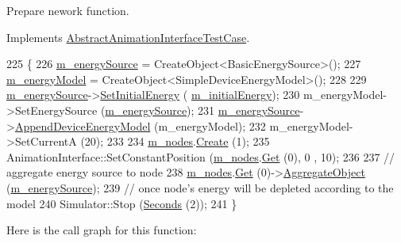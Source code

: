 Prepare nework function. 



Implements \hyperlink{classAbstractAnimationInterfaceTestCase_af9fb9b43d1f48224178f9e19692039a6}{Abstract\+Animation\+Interface\+Test\+Case}.


\begin{DoxyCode}
225 \{
226   \hyperlink{classAnimationRemainingEnergyTestCase_ab57a5fb126e09a5001d23ced08867778}{m\_energySource} = CreateObject<BasicEnergySource>();
227   \hyperlink{classAnimationRemainingEnergyTestCase_a992202ae075859acd996f44fd3396d68}{m\_energyModel} = CreateObject<SimpleDeviceEnergyModel>();
228 
229   \hyperlink{classAnimationRemainingEnergyTestCase_ab57a5fb126e09a5001d23ced08867778}{m\_energySource}->\hyperlink{classns3_1_1BasicEnergySource_ae554fd5c9a66409a364b1d58f20bb4cc}{SetInitialEnergy} (
      \hyperlink{classAnimationRemainingEnergyTestCase_a2e8b91bd1e920bea38977402cd602b3c}{m\_initialEnergy});
230   m\_energyModel->SetEnergySource (\hyperlink{classAnimationRemainingEnergyTestCase_ab57a5fb126e09a5001d23ced08867778}{m\_energySource});
231   \hyperlink{classAnimationRemainingEnergyTestCase_ab57a5fb126e09a5001d23ced08867778}{m\_energySource}->\hyperlink{classns3_1_1EnergySource_a075fe242ae7523cc071752ab1b6b7c02}{AppendDeviceEnergyModel} (m\_energyModel);
232   m\_energyModel->SetCurrentA (20);
233 
234   \hyperlink{classAbstractAnimationInterfaceTestCase_aa051bd1bbd7f335a863a168c27167b38}{m\_nodes}.\hyperlink{classns3_1_1NodeContainer_a787f059e2813e8b951cc6914d11dfe69}{Create} (1);
235   AnimationInterface::SetConstantPosition (\hyperlink{classAbstractAnimationInterfaceTestCase_aa051bd1bbd7f335a863a168c27167b38}{m\_nodes}.\hyperlink{classns3_1_1NodeContainer_a9ed96e2ecc22e0f5a3d4842eb9bf90bf}{Get} (0), 0 , 10);
236 
237   \textcolor{comment}{// aggregate energy source to node}
238   \hyperlink{classAbstractAnimationInterfaceTestCase_aa051bd1bbd7f335a863a168c27167b38}{m\_nodes}.\hyperlink{classns3_1_1NodeContainer_a9ed96e2ecc22e0f5a3d4842eb9bf90bf}{Get} (0)->\hyperlink{classns3_1_1Object_a79dd435d300f3deca814553f561a2922}{AggregateObject} (\hyperlink{classAnimationRemainingEnergyTestCase_ab57a5fb126e09a5001d23ced08867778}{m\_energySource});
239   \textcolor{comment}{// once node's energy will be depleted according to the model}
240   Simulator::Stop (\hyperlink{group__timecivil_ga33c34b816f8ff6628e33d5c8e9713b9e}{Seconds} (2));
241 \}
\end{DoxyCode}


Here is the call graph for this function\+:





